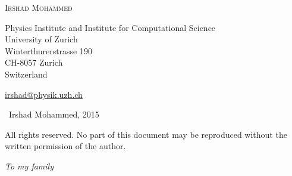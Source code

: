\documentclass[
  11pt,
  twoside,
  openright,
  titlepage,
  headings=optiontoheadandtoc
]{scrbook}
\begin{document}
\clearpage
\thispagestyle{empty}

\vspace*{0.08\textheight}

\noindent
{\large\scshape Irshad Mohammed\par}

\vspace{1.1em}

\noindent
{\small
Physics Institute and Institute for Computational Science\\
University of Zurich\\
Winterthurerstrasse 190\\
CH-8057 Zurich\\
Switzerland\par}

\vspace{1.1em}

\noindent
{\small\href{mailto:irshad@physik.uzh.ch}{irshad@physik.uzh.ch}\par}

\vfill

\noindent
{\small
\textcopyright\ Irshad Mohammed, 2015\par}

\vspace{0.6em}

\noindent
\begin{minipage}{0.82\textwidth}
  \small
  All rights reserved. No part of this document may be reproduced
  without the written permission of the author.
\end{minipage}

\vspace*{0.04\textheight}

\cleardoublepage
\thispagestyle{empty}

\vspace*{0.38\textheight}

\begin{flushright}
  {\large\itshape To my family\par}
\end{flushright}

\cleardoublepage
\pagestyle{empty}
\begingroup
\renewcommand*{\chapterpagestyle}{empty}
\tableofcontents
\endgroup

\cleardoublepage
\pagestyle{scrheadings}

\begingroup
\setlength{\parindent}{0pt}
\setlength{\parskip}{0.85em plus 0.15em minus 0.1em}
\end{document}
